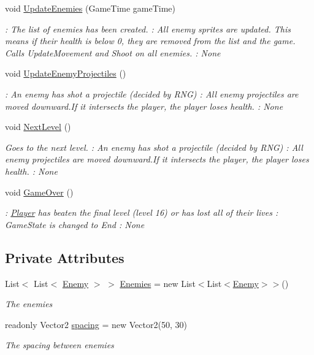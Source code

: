 \begin{DoxyCompactItemize}
void \hyperlink{classXaria_1_1Level_a46a7b08381a882d95321d41f0ab7537f}{Update\+Enemies} (Game\+Time game\+Time)
\begin{DoxyCompactList}\small\item\em \+: The list of enemies has been created. \+: All enemy sprites are updated. This means if their health is below 0, they are removed from the list and the game. Calls Update\+Movement and Shoot on all enemies. \+: None \end{DoxyCompactList}\item 
void \hyperlink{classXaria_1_1Level_a9c32c2aeebc7fefe181b142fe03cae78}{Update\+Enemy\+Projectiles} ()
\begin{DoxyCompactList}\small\item\em \+: An enemy has shot a projectile (decided by R\+NG) \+: All enemy projectiles are moved downward.\+If it intersects the player, the player loses health. \+: None \end{DoxyCompactList}\item 
void \hyperlink{classXaria_1_1Level_ab1b45e8eacae455500518158aceadeba}{Next\+Level} ()
\begin{DoxyCompactList}\small\item\em Goes to the next level. \+: An enemy has shot a projectile (decided by R\+NG) \+: All enemy projectiles are moved downward.\+If it intersects the player, the player loses health. \+: None \end{DoxyCompactList}\item 
void \hyperlink{classXaria_1_1Level_aca4ebca18f725704744d9c51073a44a5}{Game\+Over} ()
\begin{DoxyCompactList}\small\item\em \+: \hyperlink{classXaria_1_1Player}{Player} has beaten the final level (level 16) or has lost all of their lives \+: Game\+State is changed to End \+: None \end{DoxyCompactList}\end{DoxyCompactItemize}
\subsection*{Private Attributes}
\begin{DoxyCompactItemize}
\item 
List$<$ List$<$ \hyperlink{classXaria_1_1Enemy}{Enemy} $>$ $>$ \hyperlink{classXaria_1_1Level_a4eff7a4620cc9fc399d3eccd477f65ab}{Enemies} = new List$<$List$<$\hyperlink{classXaria_1_1Enemy}{Enemy}$>$$>$()
\begin{DoxyCompactList}\small\item\em The enemies \end{DoxyCompactList}\item 
readonly Vector2 \hyperlink{classXaria_1_1Level_a11828cb0f191abce748eccf9921cf83a}{spacing} = new Vector2(50, 30)
\begin{DoxyCompactList}\small\item\em The spacing between enemies \end{DoxyCompactList}\end{DoxyCompactItemize}


